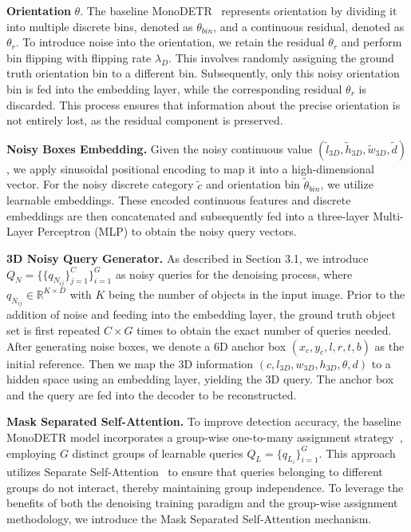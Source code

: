 \textbf{Orientation} $\theta$. The baseline MonoDETR~\cite{MonoDETR} represents orientation by dividing it into multiple discrete bins, denoted as $\theta_{bin}$, and a continuous residual, denoted as $\theta_r$. To introduce noise into the orientation, we retain the residual $\theta_r$ and perform bin flipping with flipping rate $\lambda_D$. This involves randomly assigning the ground truth orientation bin to a different bin. Subsequently, only this noisy orientation bin is fed into the embedding layer, while the corresponding residual $\theta_r$ is discarded. This process ensures that information about the precise orientation is not entirely lost, as the residual component is preserved.

\textbf{Noisy Boxes Embedding.} Given the noisy continuous value $\left(\widetilde{l}_{3D}, \widetilde{h}_{3D}, \widetilde{w}_{3D}, \widetilde{d}\right)$, we apply sinusoidal positional encoding to map it into a high-dimensional vector. For the noisy discrete category $\widetilde{c}$ and orientation bin $\widetilde{\theta}_{bin}$, we utilize learnable embeddings. These encoded continuous features and discrete embeddings are then concatenated and subsequently fed into a three-layer Multi-Layer Perceptron (MLP) to obtain the noisy query vectors.

\textbf{3D Noisy Query Generator.} As described in Section 3.1, we introduce $Q_N = \{\{q_{N_{ij}}\}_{j=1}^C\}_{i=1}^G$ as noisy queries for the denoising process, where $q_{N_{ij}}\in \mathbb{R}^{K\times D}$ with $K$ being the number of objects in the input image. Prior to the addition of noise and feeding into the embedding layer, the ground truth object set is first repeated $C \times G$ times to obtain the exact number of queries needed. After generating noise boxes, we denote a 6D anchor box $\left(x_c,y_c,l,r,t,b\right)$ as the initial reference. Then we map the 3D information $\left(c,l_{3D},w_{3D},h_{3D},\theta,d\right)$ to a hidden space using an embedding layer, yielding the 3D query. The anchor box and the query are fed into the decoder to be reconstructed.

\noindent\textbf{Mask Separated Self-Attention.} To improve detection accuracy, the baseline MonoDETR model incorporates a group-wise one-to-many assignment strategy~\cite{GroupDETR}, employing $G$ distinct groups of learnable queries $Q_L = \{q_{L_i}\}_{i=1}^G$. This approach utilizes Separate Self-Attention~\cite{GroupDETR} to ensure that queries belonging to different groups do not interact, thereby maintaining group independence. To leverage the benefits of both the denoising training paradigm and the group-wise assignment methodology, we introduce the Mask Separated Self-Attention mechanism.

